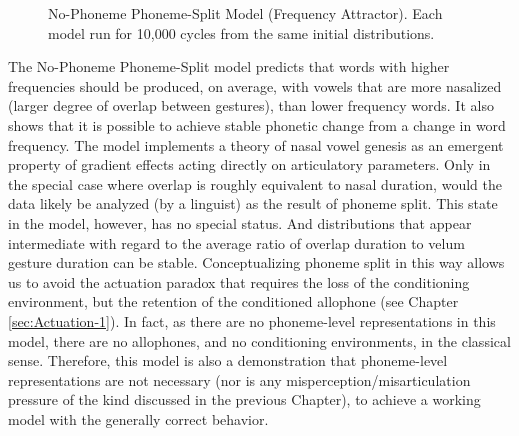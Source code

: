 \begin{figure}[H]

\caption{\label{fig:NasalizationModel1}No-Phoneme Phoneme-Split Model (Frequency
Attractor). Each model run for 10,000 cycles from the same initial
distributions. }
\end{figure}

The No-Phoneme Phoneme-Split model predicts that words with higher
frequencies should be produced, on average, with vowels that are more
nasalized (larger degree of overlap between gestures), than lower
frequency words. It also shows that it is possible to achieve stable
phonetic change from a change in word frequency. The model implements
a theory of nasal vowel genesis as an emergent property of gradient
effects acting directly on articulatory parameters. Only in the special
case where overlap is roughly equivalent to nasal duration, would
the data likely be analyzed (by a linguist) as the result of phoneme
split. This state in the model, however, has no special status. And
distributions that appear intermediate with regard to the average
ratio of overlap duration to velum gesture duration can be stable.
Conceptualizing phoneme split in this way allows us to avoid the actuation
paradox that requires the loss of the conditioning environment, but
the retention of the conditioned allophone (see Chapter \ref{sec:Actuation-1}).
In fact, as there are no phoneme-level representations in this model,
there are no allophones, and no conditioning environments, in the
classical sense. Therefore, this model is also a demonstration that
phoneme-level representations are not necessary (nor is any misperception/misarticulation
pressure of the kind discussed in the previous Chapter), to achieve
a working model with the generally correct behavior. 


